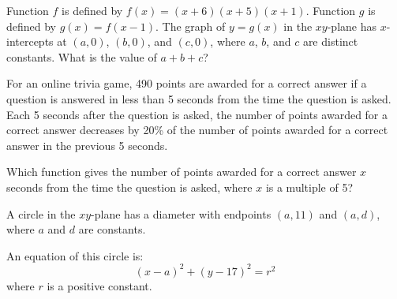 \vspace{0.75em}


\newpage


\noindent\markforreview
\vspace{1em}

Function $f$ is defined by $f(x) = (x + 6)(x + 5)(x + 1)$.  
Function $g$ is defined by $g(x) = f(x - 1)$.  
The graph of $y = g(x)$ in the $xy$-plane has $x$-intercepts at $(a, 0)$, $(b, 0)$, and $(c, 0)$, where $a$, $b$, and $c$ are distinct constants.  
What is the value of $a + b + c$?

\vspace{0.75em}









\newpage

\noindent\markforreview
\vspace{1em}

For an online trivia game, 490 points are awarded for a correct answer if a question is answered in less than 5 seconds from the time the question is asked.  
Each 5 seconds after the question is asked, the number of points awarded for a correct answer decreases by 20\% of the number of points awarded for a correct answer in the previous 5 seconds.  

Which function gives the number of points awarded for a correct answer \(x\) seconds from the time the question is asked, where \(x\) is a multiple of 5?

\vspace{0.75em}


\vspace{2em}

\noindent\markforreview
\vspace{1em}

A circle in the \(xy\)-plane has a diameter with endpoints \((a,11)\) and \((a,d)\), where \(a\) and \(d\) are constants.  

An equation of this circle is:  
\[
(x - a)^2 + (y - 17)^2 = r^2
\]  
where \(r\) is a positive constant.

